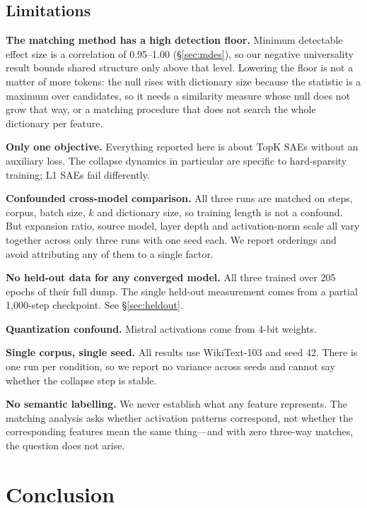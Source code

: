 \documentclass[11pt]{article}
\begin{document}
\subsection{Limitations}

\textbf{The matching method has a high detection floor.} Minimum detectable effect size
is a correlation of 0.95--1.00 (\S\ref{sec:mdes}), so our negative universality result
bounds shared structure only above that level. Lowering the floor is not a matter of more
tokens: the null rises with dictionary size because the statistic is a maximum over
candidates, so it needs a similarity measure whose null does not grow that way, or a
matching procedure that does not search the whole dictionary per feature.


\textbf{Only one objective.} Everything reported here is about TopK SAEs without an
auxiliary loss. The collapse dynamics in particular are specific to hard-sparsity
training; L1 SAEs fail differently.

\textbf{Confounded cross-model comparison.} All three runs are matched on steps,
corpus, batch size, $k$ and dictionary size, so training length is not a confound. But
expansion ratio, source model, layer depth and activation-norm scale all vary together
across only three runs with one seed each. We report orderings and avoid attributing
any of them to a single factor.

\textbf{No held-out data for any converged model.} All three trained over 205 epochs
of their full dump. The single held-out measurement comes from a partial 1{,}000-step
checkpoint. See \S\ref{sec:heldout}.

\textbf{Quantization confound.} Mistral activations come from 4-bit weights.

\textbf{Single corpus, single seed.} All results use WikiText-103 and seed 42. There is
one run per condition, so we report no variance across seeds and cannot say whether the
collapse step is stable.

\textbf{No semantic labelling.} We never establish what any feature represents. The
matching analysis asks whether activation patterns correspond, not whether the
corresponding features mean the same thing---and with zero three-way matches, the
question does not arise.

\section{Conclusion}
\label{sec:conclusion}
\end{document}
